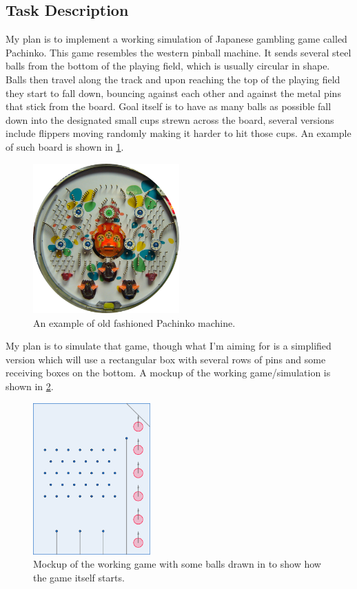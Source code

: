 \documentclass[a4,10pt]{article}
\begin{document}
\subsection{Task Description}
My plan is to implement a working simulation of Japanese gambling game called Pachinko. This game resembles the western pinball machine. It sends several steel balls from the bottom of the playing field, which is usually circular in shape. Balls then travel along the track and upon reaching the top of the playing field they start to fall down, bouncing against each other and against the metal pins that stick from the board. Goal itself is to have as many balls as possible fall down into the designated small cups strewn across the board, several versions include flippers moving randomly making it harder to hit those cups. An example of such board is shown in \cref{OriginalPachinko}.
\begin{figure}[H]
  \centering
  \includegraphics[width=0.5\textwidth]{PachinkoBoard}
  \caption{An example of old fashioned Pachinko machine.} \label{OriginalPachinko}
\end{figure}
My plan is to simulate that game, though what I'm aiming for is a simplified version which will use a rectangular box with several rows of pins and some receiving boxes on the bottom. A mockup of the working game/simulation is shown in \cref{Pachinko}.
\begin{figure}[H]
  \centering
  \includegraphics[width=0.4\textwidth]{Pachinko}
  \caption{Mockup of the working game with some balls drawn in to show how the game itself starts.} \label{Pachinko}
\end{figure}
\end{document}
